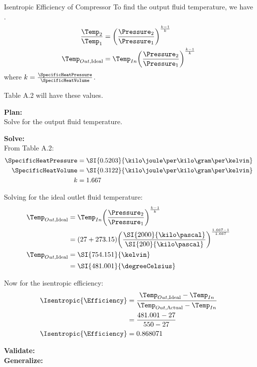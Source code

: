\begin{example}{Isentropic Efficiency of Compressor}
  To find the  output fluid temperature, we have .
  \begin{align*}
    \frac{\Temp_{2}}{\Temp_{1}} &= {\left( \frac{\Pressure_{2}}{\Pressure_{1}} \right)}^{\frac{k-1}{k}} \\
    \Temp_{Out, \text{Ideal}} &= \Temp_{In} {\left( \frac{\Pressure_{2}}{\Pressure_{1}} \right)}^{\frac{k-1}{k}}
  \end{align*}
  where $k = \frac{\SpecificHeatPressure}{\SpecificHeatVolume}$.

  Table A.2 will have these values.

  \textbf{Plan:} \\
  Solve for the  output fluid temperature.

  \textbf{Solve:} \\
  From Table A.2:
  \begin{align*}
    \SpecificHeatPressure &= \SI{0.5203}{\kilo\joule\per\kilo\gram\per\kelvin} \\
    \SpecificHeatVolume &= \SI{0.3122}{\kilo\joule\per\kilo\gram\per\kelvin} \\
    k &= 1.667
  \end{align*}

  Solving for the ideal outlet fluid temperature:
  \begin{align*}
    \Temp_{Out, \text{Ideal}} &= \Temp_{In} {\left( \frac{\Pressure_{2}}{\Pressure_{1}} \right)}^{\frac{k-1}{k}} \\
                              &= (27 + 273.15) {\left( \frac{\SI{2000}{\kilo\pascal}}{\SI{200}{\kilo\pascal}} \right)}^{\frac{1.667 - 1}{1.667}} \\
    \Temp_{Out, \text{Ideal}} &= \SI{754.151}{\kelvin} \\
                              &= \SI{481.001}{\degreeCelsius}
  \end{align*}

  Now for the isentropic efficiency:
  \begin{align*}
    \Isentropic{\Efficiency} &= \frac{\Temp_{Out, \text{Ideal}} - \Temp_{In}}{\Temp_{Out, \text{Actual}} - \Temp_{In}} \\
                             &= \frac{481.001 - 27}{550 - 27} \\
    \Isentropic{\Efficiency} &= 0.868071
  \end{align*}

  \textbf{Validate:} \\

  \textbf{Generalize:} \\

\end{example}

